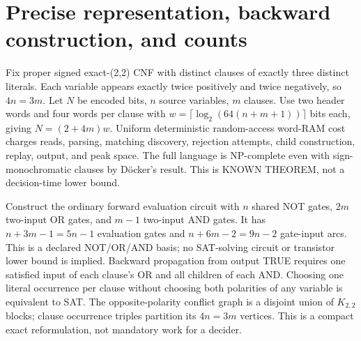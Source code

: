 \documentclass[11pt]{article}
\begin{document}
\section{Precise representation, backward construction, and counts}
Fix proper signed exact-(2,2) CNF with distinct clauses of exactly three distinct literals. Each variable appears exactly twice positively and twice negatively, so $4n=3m$. Let $N$ be encoded bits, $n$ source variables, $m$ clauses. Use two header words and four words per clause with $w=\lceil\log_2(64(n+m+1))\rceil$ bits each, giving $N=(2+4m)w$. Uniform deterministic random-access word-RAM cost charges reads, parsing, matching discovery, rejection attempts, child construction, replay, output, and peak space. The full language is NP-complete even with sign-monochromatic clauses by D\"ocker's result. This is KNOWN THEOREM, not a decision-time lower bound.
\par\noindent Construct the ordinary forward evaluation circuit with $n$ shared NOT gates, $2m$ two-input OR gates, and $m-1$ two-input AND gates. It has $n+3m-1=5n-1$ evaluation gates and $n+6m-2=9n-2$ gate-input arcs. This is a declared NOT/OR/AND basis; no SAT-solving circuit or transistor lower bound is implied. Backward propagation from output TRUE requires one satisfied input of each clause's OR and all children of each AND. Choosing one literal occurrence per clause without choosing both polarities of any variable is equivalent to SAT. The opposite-polarity conflict graph is a disjoint union of $K_{2,2}$ blocks; clause occurrence triples partition its $4n=3m$ vertices. This is a compact exact reformulation, not mandatory work for a decider.
\end{document}
